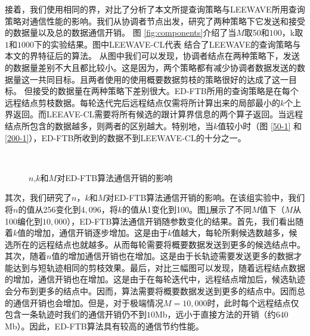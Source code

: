 接着，我们使用相同的界，对比了分析了本文所提查询策略与LEEWAVE所用查询策略对通信性能的影响。我们从协调者节点出发，研究了两种策略下它发送和接受的数据量以及总的数据通信开销。
图 \ref{fig:components}介绍了当$M$取50和$100$，k取$1$和$1000$下的实验结果。图中LEEWAVE-CL代表
结合了LEEWAVE的查询策略与本文的界特征后的算法。
从图中我们可以发现，协调者结点在两种策略下，发送的数据量差别不大且都比较小。这是因为，两个策略都有减少协调者数据发送的数据量这一共同目标。且两者使用的使用概要数据剪枝的策略很好的达成了这一目标。
但接受的数据量在两种策略下差别很大。ED-FTB所用的查询策略是在每个远程结点剪枝数据。每轮迭代完后远程结点仅需将所计算出来的局部最小的$k$个上界返回。而LEEAVE-CL需要将所有候选的跟计算界信息的两个算子返回。当远程结点所包含的数据越多，则两者的区别越大。特别地，当$k$值较小时（图 \ref{50-1} 和 \ref{200-1}），ED-FTB所收到的数据不到LEEWAVE-CL的十分之一。


\begin{figure}[t]
	\centering
		\centering
	\\
		\caption{$n$,$k$和$M$对ED-FTB算法通信开销的影响}
		\label{fig:costKM}
\end{figure}
其次，我们研究了$n$，$k$和$M$对ED-FTB算法通信开销的影响。在该组实验中，我们将$n$的值从256变化到$4,096$，将$k$的值从1变化到100。图\ref{fig:costKM}展示了不同$M$值下（$M$从100编化到$10,000$），ED-FTB算法通信开销随参数变化的结果。首先，我们看出随着$k$值的增加，通信开销逐步增加。这是由于$k$值越大，每轮所剩候选数越多，候选所在的远程结点也就越多。从而每轮需要将概要数据发送到更多的候选结点中。其次，随着$n$值的增加通信开销也在增加。这是由于长轨迹需要发送更多的数据才能达到与短轨迹相同的剪枝效果。最后，对比三幅图可以发现，随着远程结点数据的增加，通信开销也在增加。这是由于在每轮迭代中，远程结点增加后，候选轨迹会分布到更多的结点中。因而，算法需要将概要数据发送到更多的结点中。因而总的通信开销也会增加。但是，对于极端情况$M=10,000$时，此时每个远程结点仅包含一条轨迹时我们的通信开销仍不到$10$Mb，远小于直接方法的开销（约$640$Mb）。因此，ED-FTB算法具有较高的通信节约性能。

